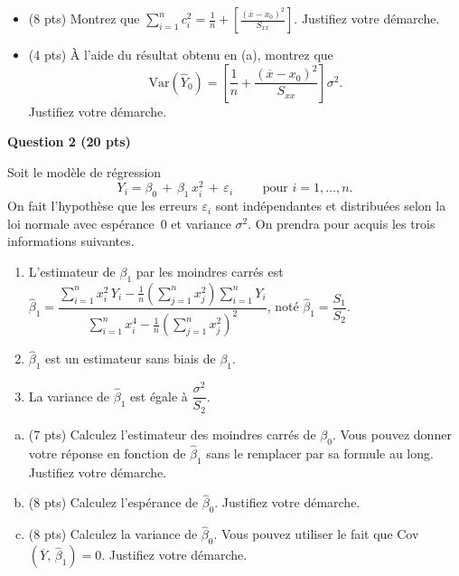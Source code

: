 \documentclass[letter, 11pt]{article}
\begin{document}
\begin{itemize}
\item[(a)] (8 pts)  Montrez que $\displaystyle \sum_{i=1}^n c_i^2 = \frac{1}{n} + \left[ \frac{(\overline{x}-x_0)^2}{S_{xx}} \right].$ Justifiez votre démarche.
\vspace{0.1 in}
\item[(b)] (4 pts) À l'aide du résultat obtenu en (a), montrez que     
$$\mathrm{Var}\left( \widehat{Y}_0 \right) = \left[ \frac{1}{n} + \frac{(\overline{x} - x_0)^2}{S_{xx}} \right] \sigma^2.$$ Justifiez votre démarche.

\end{itemize}


\newpage

\textbf{Question 2 (20 pts)} 

Soit le modèle de régression
$$
Y_i = \beta_0\,+\,\beta_1\, x_i^2 \,+\, \varepsilon_i\qquad \text{ pour } i=1,\ldots,n.
$$
On fait l'hypothèse que les erreurs $\varepsilon_i$ sont indépendantes et distribuées selon la loi normale avec espérance~0 et variance $\sigma^2$. On prendra pour acquis les trois informations suivantes.

\begin{enumerate}[$\bullet$]\itemsep 3mm
\item L'estimateur de $\beta_1$ par les moindres carrés est $\hat\beta_1= \dfrac{\sum\limits_{i=1}^n x_i^2\,Y_i - \frac{1}{n}\left(\sum\limits_{j=1}^nx_j^2\right)\sum\limits_{i=1}^n Y_i}{\sum\limits_{i=1}^n x_i^4-\frac{1}{n}\left(\sum\limits_{j=1}^nx_j^2\right)^2}$, noté $\hat\beta_1= \dfrac{S_1}{S_2}$.
\item $\hat\beta_1$ est un estimateur sans biais de $\beta_1$.
\item La variance de $\hat\beta_1$ est égale à $\dfrac{\sigma^2}{S_2}$. %
\end{enumerate}


\begin{enumerate}[(a)]
\item  (7 pts) Calculez l'estimateur des moindres carrés de $\beta_0$. Vous pouvez donner votre réponse en fonction de $\hat\beta_1$ sans le remplacer par sa formule au long. Justifiez votre démarche.
\item (8 pts) Calculez l'espérance de $\hat\beta_0$. Justifiez votre démarche.
\item (8 pts)  Calculez la variance de $\hat\beta_0$. Vous pouvez utiliser le fait que Cov$(\overline Y,\,\hat\beta_1)=0$. Justifiez votre démarche.
\end{enumerate}
\end{document}
